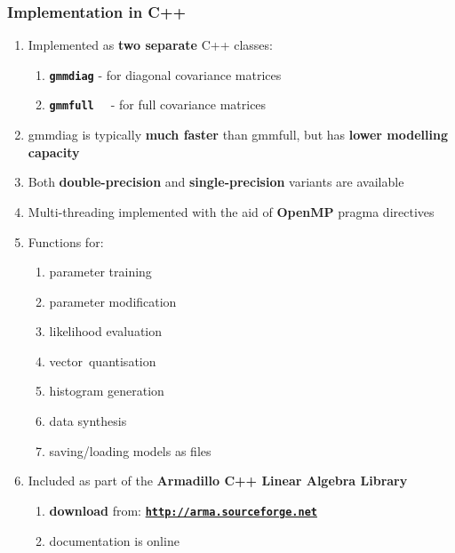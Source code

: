 \documentclass[usenames,dvipsnames]{beamer}
\def\_{{\tt\char95}}
\begin{document}
\begin{frame}
\frametitle{Implementation in C++}

\begin{enumerate}[{~~$\boldsymbol{\bullet}$}]

\item
Implemented as {\bf two separate} C++ classes:


\begin{enumerate}[{$\boldsymbol{\rightarrow}$}]
\renewcommand{\itemsep}{0.9ex}

\item
\texttt{\bf gmm\_diag} - for diagonal covariance matrices

\item
\texttt{\bf gmm\_full~~} - for full covariance matrices

\end{enumerate}

\item gmm\_diag is typically {\bf much faster} than gmm\_full, but has {\bf lower modelling capacity}
\vspace{1ex}

\item Both {\bf double-precision} and {\bf single-precision} variants are available
\vspace{1ex}

\item Multi-threading implemented with the aid of {\bf OpenMP} pragma directives
\vspace{1ex}

\item 
Functions for:
%
\begin{enumerate}[{$\boldsymbol{\rightarrow}$}]
\scriptsize
\item parameter training
\item parameter modification
\item likelihood evaluation
\item vector~quantisation
\item histogram generation
\item data synthesis
\item saving/loading models as files
\end{enumerate}
\vspace{1ex}


\item Included as part of the {\bf Armadillo C++ Linear Algebra Library}

\begin{enumerate}[{$\boldsymbol{\rightarrow}$}]
\renewcommand{\itemsep}{0.9ex}

\item
{\bf download} from: \textcolor{red}{\href{http://arma.sourceforge.net}{\tt\textbf{http://arma.sourceforge.net}}}

\item documentation is online
\end{enumerate}


\end{enumerate}
\end{frame}
\end{document}
